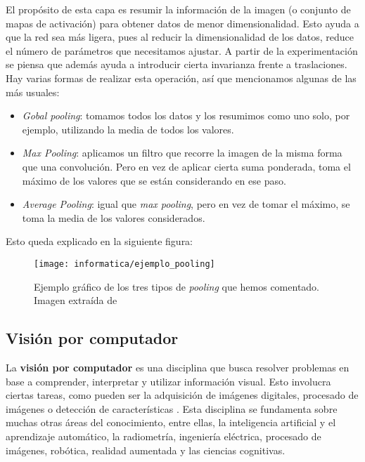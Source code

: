 El propósito de esta capa es resumir la información de la imagen (o conjunto de mapas de activación) para obtener datos de menor dimensionalidad. Esto ayuda a que la red sea más ligera, pues al reducir la dimensionalidad de los datos, reduce el número de parámetros que necesitamos ajustar. A partir de la experimentación se piensa que además ayuda a introducir cierta invarianza frente a traslaciones. Hay varias formas de realizar esta operación, así que mencionamos algunas de las más usuales:

\begin{itemize}
	\item \textit{Gobal pooling}: tomamos todos los datos y los resumimos como uno solo, por ejemplo, utilizando la media de todos los valores.
	\item \textit{Max Pooling}: aplicamos un filtro que recorre la imagen de la misma forma que una convolución. Pero en vez de aplicar cierta suma ponderada, toma el máximo de los valores que se están considerando en ese paso.
	\item \textit{Average Pooling}: igual que \textit{max pooling}, pero en vez de tomar el máximo, se toma la media de los valores considerados.
\end{itemize}

Esto queda explicado en la siguiente figura:

\begin{figure}[H]
	\centering
	\texttt{[image: informatica/ejemplo\_pooling]}
	\caption{Ejemplo gráfico de los tres tipos de \textit{pooling} que hemos comentado. Imagen extraída de \cite{informatica:paper_definicion_cnn}}
\end{figure}

\subsection{Visión por computador}

La \textbf{visión por computador} es una disciplina que busca resolver problemas en base a comprender, interpretar y utilizar información visual. Esto involucra ciertas tareas, como pueden ser la adquisición de imágenes digitales, procesado de imágenes o detección de características \cite{informatica:cv_modern_approach}. Esta disciplina se fundamenta sobre muchas otras áreas del conocimiento, entre ellas, la inteligencia artificial y el aprendizaje automático, la radiometría, ingeniería eléctrica, procesado de imágenes, robótica, realidad aumentada y las ciencias cognitivas.


